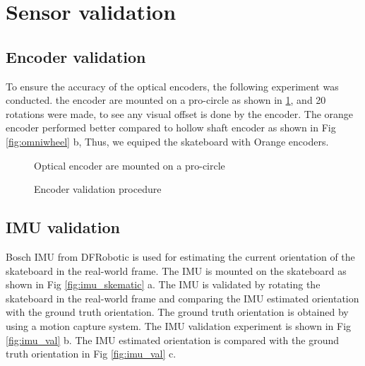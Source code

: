 \documentclass[12pt, twoside]{report}
\begin{document}
\newpage
\section{Sensor validation}
\subsection{Encoder validation}

To ensure the accuracy of the optical encoders, the following experiment was conducted.
the encoder are mounted on a pro-circle as shown in \ref{fig:encoder_val}, and 20 rotations were made, to see any visual offset
is done by the encoder. The orange encoder performed better compared to hollow shaft encoder as shown in Fig \ref{fig:omniwheel} b,
Thus, we equiped the skateboard with Orange encoders.

\begin{figure}[hbt!]
    \centering
    \caption{Encoder validation procedure}
    {Optical encoder are mounted on a pro-circle}
    \label{fig:encoder_val}
\end{figure}

\subsection{IMU validation}

Bosch IMU from DFRobotic is used for estimating the current orientation of the skateboard
in the real-world frame. The IMU is mounted on the skateboard as shown in Fig \ref{fig:imu_skematic} a.
The IMU is validated by rotating the skateboard in the real-world frame
and comparing the IMU estimated orientation with the ground truth orientation. The ground truth orientation
is obtained by using a motion capture system. The IMU validation experiment is shown in Fig \ref{fig:imu_val} b.
The IMU estimated orientation is compared with the ground truth orientation in Fig \ref{fig:imu_val} c. \\
\end{document}
